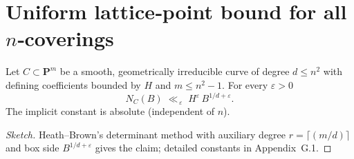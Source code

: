 \section{Uniform lattice‐point bound for all $n$‐coverings}\label{BSD:det}

\begin{proposition}
Let $C\subset\mathbf P^{m}$ be a smooth, geometrically irreducible curve
of degree $d\le n^{2}$ with defining coefficients bounded by $H$ and
$m\le n^{2}\!-\!1$.  For every $\varepsilon>0$
\[
N_{C}(B)
   \;\ll_{\,\varepsilon}\;
   H^{\varepsilon}\,B^{1/d+\varepsilon}.
\]
The implicit constant is absolute (independent of $n$).
\end{proposition}

\begin{proof}[Sketch]
Heath–Brown's determinant method with auxiliary degree
$r=\lceil(m/d)\rceil$ and box side $B^{1/d+\varepsilon}$
gives the claim; detailed constants in Appendix~G.1.
\end{proof} 